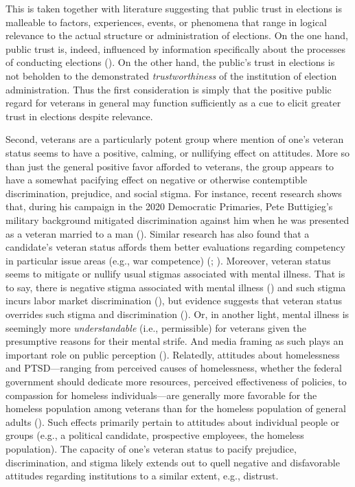 \documentclass[
  12pt,
  letterpaper,
]{article}
\begin{document}
This is taken together with literature suggesting that public trust in
elections is malleable to factors, experiences, events, or phenomena
that range in logical relevance to the actual structure or
administration of elections. On the one hand, public trust is, indeed,
influenced by information specifically about the processes of conducting
elections (). On the
other hand, the public's trust in elections is not beholden to the
demonstrated \emph{trustworthiness} of the institution of election
administration. Thus the first consideration is simply that the positive
public regard for veterans in general may function sufficiently as a cue
to elicit greater trust in elections despite relevance.

Second, veterans are a particularly potent group where mention of one's
veteran status seems to have a positive, calming, or nullifying effect
on attitudes. More so than just the general positive favor afforded to
veterans, the group appears to have a somewhat pacifying effect on
negative or otherwise contemptible discrimination, prejudice, and social
stigma. For instance, recent research shows that, during his campaign in
the 2020 Democratic Primaries, Pete Buttigieg's military background
mitigated discrimination against him when he was presented as a veteran
married to a man ().
Similar research has also found that a candidate's veteran status
affords them better evaluations regarding competency in particular issue
areas (e.g., war competence) (; ). Moreover, veteran status
seems to mitigate or nullify usual stigmas associated with mental
illness. That is to say, there is negative stigma associated with mental
illness () and such
stigma incurs labor market discrimination
(), but evidence suggests
that veteran status overrides such stigma and discrimination
(). Or, in another
light, mental illness is seemingly more \emph{understandable} (i.e.,
permissible) for veterans given the presumptive reasons for their mental
strife. And media framing as such plays an important role on public
perception ().
Relatedly, attitudes about homelessness and PTSD---ranging from
perceived causes of homelessness, whether the federal government should
dedicate more resources, perceived effectiveness of policies, to
compassion for homeless individuals---are generally more favorable for
the homeless population among veterans than for the homeless population
of general adults (). Such
effects primarily pertain to attitudes about individual people or groups
(e.g., a political candidate, prospective employees, the homeless
population). The capacity of one's veteran status to pacify prejudice,
discrimination, and stigma likely extends out to quell negative and
disfavorable attitudes regarding institutions to a similar extent, e.g.,
distrust.
\end{document}
